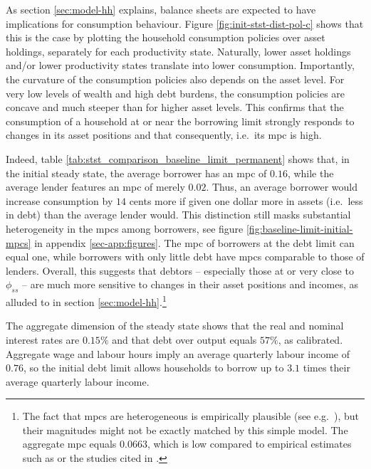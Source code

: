 \documentclass[a4paper,12pt]{article} %
\numberwithin{equation}{section} %
\numberwithin{figure}{section}
\numberwithin{table}{section}
\begin{document}
As section \ref{sec:model-hh} explains, balance sheets are expected to have implications for consumption behaviour. Figure \ref{fig:init-stst-dist-pol-c} shows that this is the case by plotting the household consumption policies over asset holdings, separately for each productivity state. Naturally, lower asset holdings and/or lower productivity states translate into lower consumption. Importantly, the curvature of the consumption policies also depends on the asset level. For very low levels of wealth and high debt burdens, the consumption policies are concave and much steeper than for higher asset levels. This confirms that the consumption of a household at or near the borrowing limit strongly responds to changes in its asset positions and that consequently, i.e.~its \Gls{mpc} is high.

Indeed, table \ref{tab:stst_comparison_baseline_limit_permanent} shows that, in the initial steady state, the average borrower has an \Gls{mpc} of $0.16$, while the average lender features an \Gls{mpc} of merely $0.02$. Thus, an average borrower would increase consumption by $14$ cents more if given one dollar more in assets (i.e.~less in debt) than the average lender would. This distinction still masks substantial heterogeneity in the \Gls{mpc}s among borrowers, see figure \ref{fig:baseline-limit-initial-mpcs} in appendix \ref{sec-app:figures}. The \Gls{mpc} of borrowers at the debt limit can equal one, while borrowers with only little debt have \Gls{mpc}s comparable to those of lenders. Overall, this suggests that debtors -- especially those at or very close to $\phi_{ss}$ -- are much more sensitive to changes in their asset positions and incomes, as alluded to in section \ref{sec:model-hh}.\footnote{The fact that \Gls{mpc}s are heterogeneous is empirically plausible (see e.g.~\cite{gross2002}), but their magnitudes might not be exactly matched by this simple model. The aggregate \Gls{mpc} equals $0.0663$, which is low compared to empirical estimates such as \textcite{fagereng2021mpc} or the studies cited in \textcite{kaplan2018}.}

The aggregate dimension of the steady state shows that the real and nominal interest rates are $0.15\%$ and that debt over output equals $57\%$, as calibrated. Aggregate wage and labour hours imply an average quarterly labour income of $0.76$, so the initial debt limit allows households to borrow up to $3.1$ times their average quarterly labour income. 

\end{document}
